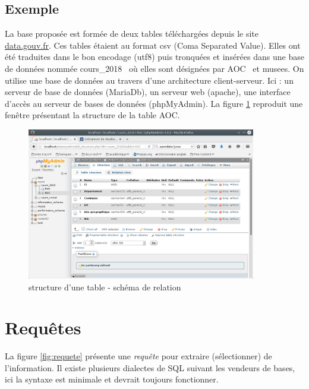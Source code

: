 \subsection{Exemple}
La base proposée est formée de deux tables téléchargées depuis le site \href{http://www.data.gouv.fr}{data.gouv.fr}.
Ces tables étaient au format csv (Coma Separated Value). Elles ont été traduites dans le bon encodage (utf8) puis tronquées et insérées dans une base de données nommée \og cours\_2018\fg~ où elles sont désignées par \og AOC\fg~ et \og musees\fg. \newline
On utilise une base de données au travers d'une architecture client-serveur. Ici : un serveur de base de données (MariaDb), un serveur web (apache), une interface d'accès au serveur de bases de données (phpMyAdmin).\newline
La figure \ref{fig:aoc} reproduit une fenêtre présentant la structure de la table \og AOC\fg.
\begin{figure}[h]
  \centering
  \includegraphics[width=10cm]{./introbdd_aoc.png}
  \caption{structure d'une table - schéma de relation}
  \label{fig:aoc}
\end{figure}


\section{Requêtes}
La figure \ref{fig:requete} présente une \emph{requête} pour extraire (sélectionner) de l'information. Il existe plusieurs dialectes de SQL suivant les vendeurs de bases, ici la syntaxe est minimale et devrait toujours fonctionner.
